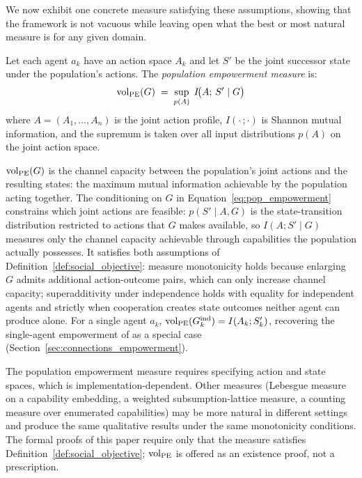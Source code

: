 We now exhibit one concrete measure satisfying these assumptions, showing that
the framework is not vacuous while leaving open what the best or most natural
measure is for any given domain.

\begin{definition}
\label{def:pop_empowerment}
Let each agent $a_k$ have an action space $A_k$ and let $S'$ be the joint
    successor state under the population's actions. The \emph{population
    empowerment measure} is:
\begin{equation}
\label{eq:pop_empowerment}
\operatorname{vol}_{\mathrm{PE}}(G) \;=\; \sup_{p(A)}\; I\!\bigl(A;\, S' \mid G\bigr)
\end{equation}
where $A = (A_1, \ldots, A_n)$ is the joint action profile, $I(\cdot\,;\cdot)$
    is Shannon mutual information, and the supremum is taken over all input
    distributions $p(A)$ on the joint action space.
\end{definition}

$\operatorname{vol}_{\mathrm{PE}}(G)$ is the channel capacity between the population's joint
actions and the resulting states: the maximum mutual information achievable by
the population acting together. The conditioning on $G$ in
Equation~\eqref{eq:pop_empowerment} constrains which joint actions are
feasible: $p(S' \mid A, G)$ is the state-transition distribution restricted to
actions that $G$ makes available, so $I(A; S' \mid G)$ measures only the
channel capacity achievable through capabilities the population actually
possesses. It satisfies both assumptions of
Definition~\ref{def:social_objective}: measure monotonicity holds because
enlarging $G$ admits additional action-outcome pairs, which can only increase
channel capacity; superadditivity under independence holds with equality for
independent agents and strictly when cooperation creates state outcomes neither
agent can produce alone. For a single agent $a_k$,
$\operatorname{vol}_{\mathrm{PE}}(G_{k}^{\mathrm{ind}}) = I(A_k; S'_k)$, recovering the single-agent
empowerment of \citet{klyubin2005empowerment} as a special case
(Section~\ref{sec:connections_empowerment}).

The population empowerment measure requires specifying action and state spaces,
which is implementation-dependent. Other measures (Lebesgue measure on a
capability embedding, a weighted subsumption-lattice measure, a counting
measure over enumerated capabilities) may be more natural in different settings
and produce the same qualitative results under the same monotonicity
conditions. The formal proofs of this paper require only that the measure
satisfies Definition~\ref{def:social_objective}; $\operatorname{vol}_{\mathrm{PE}}$ is
offered as an existence proof, not a prescription.

